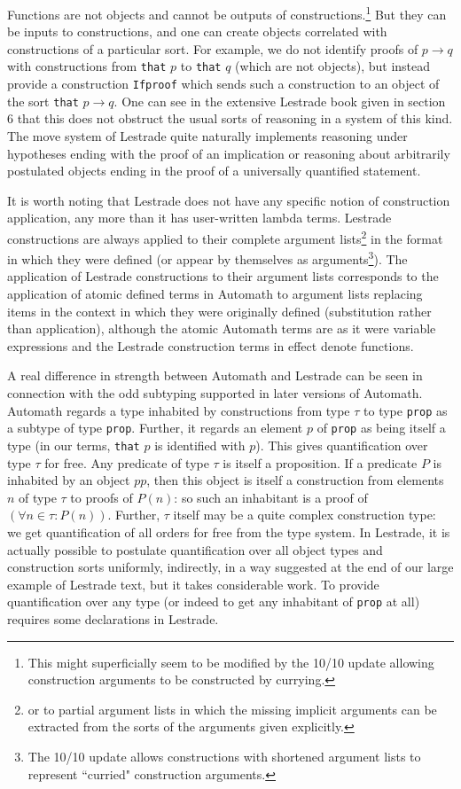 \documentclass[12pt]{article}
\begin{document}
Functions are  not objects and cannot be outputs of constructions.\footnote{This might superficially seem to be modified by the 10/10 update allowing construction arguments to be constructed by currying.}   But they can be inputs to constructions, and one can create objects correlated with constructions of a particular sort.  For example, we do not identify proofs of $p \rightarrow q$ with constructions from {\tt that} $p$ to {\tt that} $q$ (which are not objects), but instead provide a construction {\tt Ifproof} which sends such a construction to an object of the sort {\tt that} $p \rightarrow q$.  One can see in the extensive Lestrade book given in section 6 that this does not obstruct the usual sorts of reasoning in a system of this kind.  The move system of Lestrade quite naturally implements reasoning under hypotheses ending with the proof of an implication or reasoning about arbitrarily postulated objects ending in the proof of a universally quantified statement.

It is worth noting that Lestrade does not have any specific notion of construction application, any more than it has user-written lambda terms.  Lestrade constructions are always applied to their complete argument lists\footnote{or to partial argument lists in which the missing implicit arguments can be extracted from the sorts of the arguments given explicitly.} in the format in which they were defined (or appear by themselves as arguments\footnote{The 10/10 update allows constructions with shortened argument lists to represent ``curried" construction arguments.}).  The application of Lestrade constructions to their argument lists corresponds
to the application of atomic defined terms in Automath to argument lists replacing items in the context in which they were originally defined (substitution rather than application), although the atomic Automath terms are as it were variable expressions and the Lestrade construction terms in effect denote functions.

A real difference in strength between Automath and Lestrade can be seen in connection with the odd subtyping supported in later versions of Automath.  Automath regards
a type inhabited by constructions from type $\tau$ to type {\tt prop} as a subtype of type {\tt prop}.  Further, it regards an element $p$ of {\tt prop} as being itself a type
(in our terms, {\tt that} $p$ is identified with $p$).   This gives quantification over type $\tau$ for free.  Any predicate of type $\tau$ is itself a proposition.  If a predicate $P$
is inhabited by an object $pp$, then this object is itself a construction from elements $n$ of type $\tau$ to proofs of $P(n)$:  so such an inhabitant is a proof of $(\forall n \in \tau:P(n))$.
Further, $\tau$ itself may be a quite complex construction type:  we get quantification of all orders for free from the type system.  In Lestrade, it is actually possible to postulate quantification over all object types and construction sorts uniformly, indirectly, in a way suggested at the end of our large example of Lestrade text, but it takes considerable work.  To  provide quantification over any type (or indeed to get any inhabitant of {\tt prop} at all) requires some declarations in Lestrade.
\end{document}
